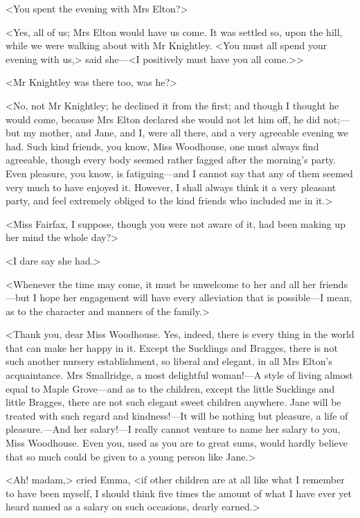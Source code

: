 <You spent the evening with Mrs Elton?>

<Yes, all of us; Mrs Elton would have us come. It was settled so, upon the hill, while we were walking about with Mr Knightley. <You must all spend your evening with us,> said she—<I positively must have you all come.>>

<Mr Knightley was there too, was he?>

<No, not Mr Knightley; he declined it from the first; and though I thought he would come, because Mrs Elton declared she would not let him off, he did not;—but my mother, and Jane, and I, were all there, and a very agreeable evening we had. Such kind friends, you know, Miss Woodhouse, one must always find agreeable, though every body seemed rather fagged after the morning's party. Even pleasure, you know, is fatiguing—and I cannot say that any of them seemed very much to have enjoyed it. However, I shall always think it a very pleasant party, and feel extremely obliged to the kind friends who included me in it.>

<Miss Fairfax, I suppose, though you were not aware of it, had been making up her mind the whole day?>

<I dare say she had.>

<Whenever the time may come, it must be unwelcome to her and all her friends—but I hope her engagement will have every alleviation that is possible—I mean, as to the character and manners of the family.>

<Thank you, dear Miss Woodhouse. Yes, indeed, there is every thing in the world that can make her happy in it. Except the Sucklings and Bragges, there is not such another nursery establishment, so liberal and elegant, in all Mrs Elton's acquaintance. Mrs Smallridge, a most delightful woman!—A style of living almost equal to Maple Grove—and as to the children, except the little Sucklings and little Bragges, there are not such elegant sweet children anywhere. Jane will be treated with such regard and kindness!—It will be nothing but pleasure, a life of pleasure.—And her salary!—I really cannot venture to name her salary to you, Miss Woodhouse. Even you, used as you are to great sums, would hardly believe that so much could be given to a young person like Jane.>

<Ah! madam,> cried Emma, <if other children are at all like what I remember to have been myself, I should think five times the amount of what I have ever yet heard named as a salary on such occasions, dearly earned.>

